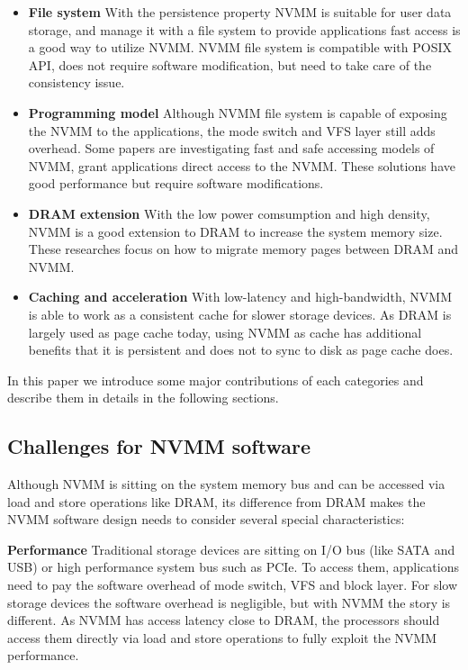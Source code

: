\begin{itemize}
\item \textbf{File system} With the persistence property NVMM is suitable for
user data storage, and manage it with a file system to provide applications
fast access is a good way to utilize NVMM. NVMM file system is compatible
with POSIX API, does not require software modification, but need to take care
of the consistency issue.

\item \textbf{Programming model} Although NVMM file system is capable
 of exposing
the NVMM to the applications, the mode switch and VFS layer still adds
overhead. Some papers are investigating fast and safe accessing models of
NVMM, grant applications direct access to the NVMM. These solutions have
good performance but require software modifications.

\item \textbf{DRAM extension} With the low power comsumption and high density,
NVMM is a good extension to DRAM to increase the system memory size. These
researches focus on how to migrate memory pages between DRAM and NVMM.

\item \textbf{Caching and acceleration} With low-latency and high-bandwidth,
NVMM is able to work as a consistent cache for slower storage devices. As
DRAM is largely used as page cache today, using NVMM as cache has additional
benefits that it is persistent and does not to sync to disk as page cache
does.

\end{itemize}  

In this paper we introduce some major contributions of each categories
 and describe them in details in the following sections.

\subsection{Challenges for NVMM software}
\label{sec:challenge}

Although NVMM is sitting on the system memory bus and can be accessed
via load and store operations like DRAM, its difference from DRAM
makes the NVMM software design needs to consider several special
characteristics:

\textbf{Performance} Traditional storage devices are sitting on I/O bus
(like SATA and USB) or high performance system bus such as PCIe. To access
them, applications need to pay the software overhead of mode switch, VFS and
block layer. For slow storage devices the software overhead is negligible,
but with NVMM the story is different. As NVMM has access latency close to
DRAM, the processors should access them directly via load and store
operations to fully exploit the NVMM performance.



